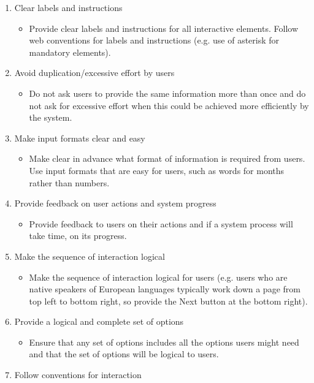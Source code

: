 \begin{itemize}
\begin{enumerate}[resume]
\begin{itemize}
		\end{itemize}
		\item Clear labels and instructions
		\begin{itemize}
			\item Provide clear labels and instructions for all interactive elements. Follow web conventions for labels and instructions (e.g. use of asterisk for mandatory elements).
		\end{itemize}
		\item Avoid duplication/excessive effort by users
		\begin{itemize}
			\item Do not ask users to provide the same information more than once and do not ask for
			excessive effort when this could be achieved more efficiently by the system.
		\end{itemize}
		\item Make input formats clear and easy
		\begin{itemize}
			\item Make clear in advance what format of information is required from users. Use input formats that are easy for users, such as words for months rather than numbers.
		\end{itemize}
		\item Provide feedback on user actions and system progress
		\begin{itemize}
			\item Provide feedback to users on their actions and if a system process will take time, on its progress.
		\end{itemize}
		\item Make the sequence of interaction logical
		\begin{itemize}
			\item Make the sequence of interaction logical for users (e.g. users who are native speakers
			of European languages typically work down a page from top left to bottom right, so provide the Next button at the bottom right).
		\end{itemize}
		\item Provide a logical and complete set of options
		\begin{itemize}
			\item Ensure that any set of options includes all the options users might need and that the set of options will be logical to users.
		\end{itemize}
		\item Follow conventions for interaction 
		\begin{itemize}

\end{itemize}
\end{enumerate}
\end{itemize}
